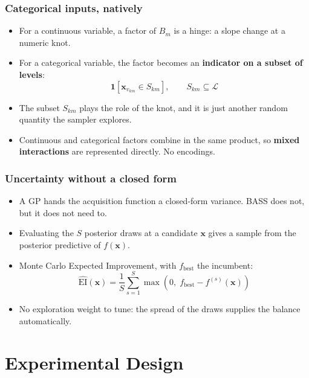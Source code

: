 \documentclass[fleqn]{beamer}
\begin{document}
\begin{frame}
  \frametitle{Categorical inputs, natively}
  \begin{itemize}
    \item For a continuous variable, a factor of $B_m$ is a hinge: a slope change at a numeric knot.
    \item For a categorical variable, the factor becomes an \textbf{indicator on a subset of levels}:
    \[ \boldsymbol{1}\left[ \boldsymbol{x}_{v_{km}} \in S_{km} \right], \qquad S_{km} \subseteq \mathcal{L} \]
    \item The subset $S_{km}$ plays the role of the knot, and it is just another random quantity the sampler explores.
    \item Continuous and categorical factors combine in the same product, so \textbf{mixed interactions} are represented directly. No encodings.
  \end{itemize}
\end{frame}

\begin{frame}
  \frametitle{Uncertainty without a closed form}
  \begin{itemize}
    \item A GP hands the acquisition function a closed-form variance. BASS does not, but it does not need to.
    \item Evaluating the $S$ posterior draws at a candidate $\boldsymbol{x}$ gives a sample from the posterior predictive of $f(\boldsymbol{x})$.
    \item Monte Carlo Expected Improvement, with $f_{\text{best}}$ the incumbent:
    \[ \widehat{\mathrm{EI}}(\boldsymbol{x}) = \frac{1}{S} \sum_{s=1}^{S} \max\left(0,\; f_{\text{best}} - f^{(s)}(\boldsymbol{x})\right) \]
    \item No exploration weight to tune: the spread of the draws supplies the balance automatically.
  \end{itemize}
\end{frame}

\section{Experimental Design}
\end{document}
